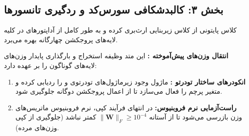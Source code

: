 \subsection*{بخش ۳: کالبدشکافی سورس‌کد و ردگیری تانسورها }
کلاس پایتونی  از کلاس زیربنایی  ارث‌بری کرده و به طور کامل از آداپتورهای  در کلیه لایه‌های پروجکشن چهارگانه بهره می‌برد.

\textbf{انتقال وزن‌های پیش‌آموخته :}
این متد وظیفه استخراج و بارگذاری پایدار وزن‌های لایه‌های گوناگون را بر عهده دارد:
\begin{enumerate}
    \item \textbf{انکودرهای ساختار تودرتو :} ماژول وجود زیرماژول‌های تودرتوی  و  را ردیابی کرده و متغیر پرچم  را فعال می‌سازد تا از اعمال پروجکشن دوگانه جلوگیری شود.
    \item \textbf{راست‌آزمایی نرم فروبنیوس:} در انتهای فرآیند کپی، نرم فروبنیوس ماتریس‌های وزن بازرسی می‌شود تا از آستانه $\|\mathbf{W}\|_F \ge 10^{-4}$ کمتر نباشد (جلوگیری از کپی وزن‌های مرده).
\end{enumerate}

